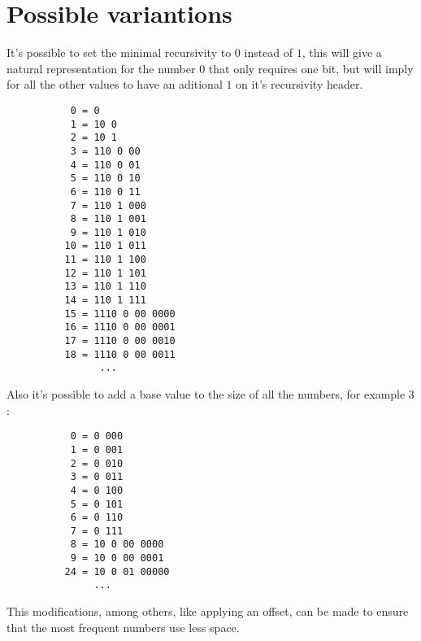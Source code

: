 \documentclass[a4paper,11pt]{article}
\begin{document}
\section{Possible variantions}
It's possible to set the minimal recursivity to $0$ instead of $1$, this will give a natural representation for the number $0$ that only requires one bit, but will imply for all the other values to have an aditional $1$ on it's recursivity header.
\begin{center} \begin{lstlisting}
           0 = 0
           1 = 10 0 
           2 = 10 1
           3 = 110 0 00
           4 = 110 0 01 
           5 = 110 0 10 
           6 = 110 0 11 
           7 = 110 1 000 
           8 = 110 1 001 
           9 = 110 1 010 
          10 = 110 1 011 
          11 = 110 1 100 
          12 = 110 1 101 
          13 = 110 1 110 
          14 = 110 1 111 
          15 = 1110 0 00 0000 
          16 = 1110 0 00 0001 
          17 = 1110 0 00 0010 
          18 = 1110 0 00 0011 
	      		...	
\end{lstlisting} \end{center}
Also it's possible to add a base value to the size of all the numbers, for example $3$:
\begin{center} \begin{lstlisting}
           0 = 0 000
           1 = 0 001
           2 = 0 010
           3 = 0 011
           4 = 0 100
           5 = 0 101
           6 = 0 110
           7 = 0 111
           8 = 10 0 00 0000
           9 = 10 0 00 0001
          24 = 10 0 01 00000
           	   ...	
\end{lstlisting} \end{center}
This modifications, among others, like applying an offset, can be made to ensure that the most frequent numbers use less space.
\end{document}

